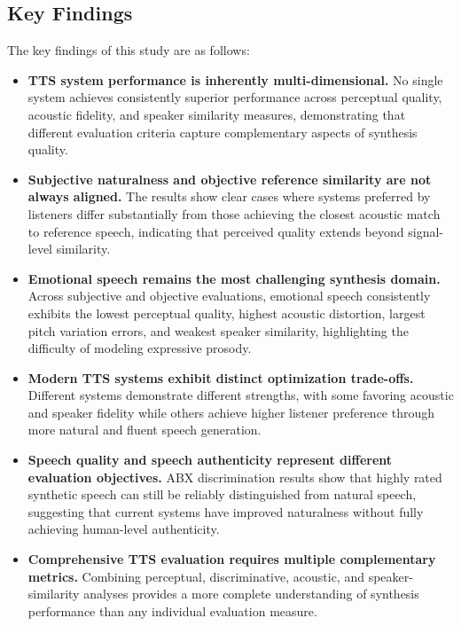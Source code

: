 \documentclass[a4paper,fleqn]{cas-dc}
\begin{document}
    \subsection {Key Findings}
\hspace*{1.2em} The key findings of this study are as follows:
\begin{itemize}

\item \textbf{TTS system performance is inherently multi-dimensional.} No single system achieves consistently superior performance across perceptual quality, acoustic fidelity, and speaker similarity measures, demonstrating that different evaluation criteria capture complementary aspects of synthesis quality.
\item \textbf{Subjective naturalness and objective reference similarity are not always aligned.} The results show clear cases where systems preferred by listeners differ substantially from those achieving the closest acoustic match to reference speech, indicating that perceived quality extends beyond signal-level similarity.
\item \textbf{Emotional speech remains the most challenging synthesis domain.} Across subjective and objective evaluations, emotional speech consistently exhibits the lowest perceptual quality, highest acoustic distortion, largest pitch variation errors, and weakest speaker similarity, highlighting the difficulty of modeling expressive prosody.
\item \textbf{Modern TTS systems exhibit distinct optimization trade-offs.} Different systems demonstrate different strengths, with some favoring acoustic and speaker fidelity while others achieve higher listener preference through more natural and fluent speech generation.
\item \textbf{Speech quality and speech authenticity represent different evaluation objectives.} ABX discrimination results show that highly rated synthetic speech can still be reliably distinguished from natural speech, suggesting that current systems have improved naturalness without fully achieving human-level authenticity.
\item \textbf{Comprehensive TTS evaluation requires multiple complementary metrics.} Combining perceptual, discriminative, acoustic, and speaker-similarity analyses provides a more complete understanding of synthesis performance than any individual evaluation measure.
\end{itemize}
    
    
\end{document}
